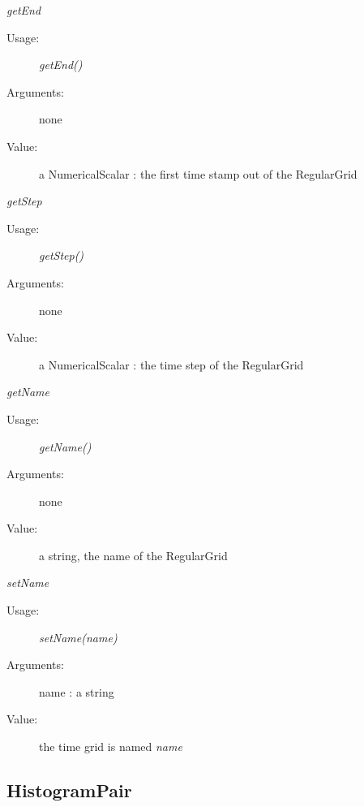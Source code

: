\begin{description}
\begin{description}
\item \textit{getEnd}
\begin{description}
\item[Usage:] \textit{getEnd()}
\item[Arguments:] none
\item[Value:] a NumericalScalar : the first time stamp out of the RegularGrid
\end{description}
\bigskip

\item \textit{getStep}
\begin{description}
\item[Usage:] \textit{getStep()}
\item[Arguments:] none
\item[Value:] a NumericalScalar : the time step of the RegularGrid
\end{description}
\bigskip

\item \textit{getName}
\begin{description}
\item[Usage:] \textit{getName()}
\item[Arguments:] none
\item[Value:] a string, the name of the RegularGrid
\end{description}
\bigskip

\item \textit{setName}
\begin{description}
\item[Usage:] \textit{setName(name)}
\item[Arguments:] name : a string
\item[Value:] the time grid is named \textit{name}
\end{description}
\bigskip

\end{description}

\end{description}




\newpage
\subsection{HistogramPair}


